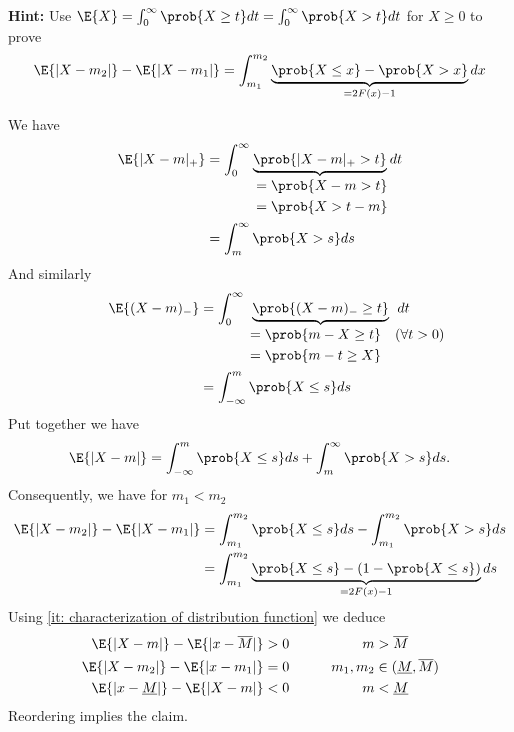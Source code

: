 \begin{exercise}
\begin{enumerate}[label=(\alph*), noitemsep]
 		\textbf{Hint:}
            Use \(\E{X}=\int_0^\infty \prob{X\ge t}dt = \int_0^\infty \prob{X>t}dt\)
            for \(X\ge 0\) to prove
            \[
                \E{\abs{X-m_2}} - \E{\abs{X-m_1}}
                = \int_{m_1}^{m_2} \underbrace{\prob{X\le x} - \prob{X>x}}_{=2F(x)-1}dx
            \]
		\begin{solution}
			We have
			\begin{align*}
				\E{\abs{X-m}_+}
				&= \int_0^\infty \underbrace{\prob{\abs{X-m}_+ > t}}_{
					\begin{aligned}
						&=\prob{X-m>t}\\
						&=\prob{X> t-m}
					\end{aligned}
				} dt\\
				&= \int_m^\infty \prob{X>s}ds
			\end{align*}
			And similarly
			\begin{align*}
				\E{(X-m)_-}
				&= \int_0^\infty \underbrace{\prob{(X-m)_- \ge t}}_{
					\begin{aligned}
						&=\prob{m-X\ge t} \quad \mathrlap{(\forall t>0)}\\
						&=\prob{m-t\ge X}
					\end{aligned}
				} dt\\
				&= \int_{-\infty}^m \prob{X\le s}ds
			\end{align*}
			Put together we have
            \[
				\E{\abs{X-m}}
				= \int_{-\infty}^m \prob{X\le s}ds + \int_m^\infty \prob{X>s}ds.
            \]
            Consequently, we have for \(m_1 < m_2\)
            \[\begin{aligned}
                \E{\abs{X-m_2}} - \E{\abs{X-m_1}}
                &= \int_{m_1}^{m_2} \prob{X\le s}ds - \int_{m_1}^{m_2} \prob{X>s}ds
                \\
                &= \int_{m_1}^{m_2} \underbrace{\prob{X\le s} - (1-\prob{X\le s})}_{=2F(x) -1}ds
            \end{aligned}
            \]
            Using \ref{it: characterization of distribution function} we deduce
            \begin{alignat*}{3}
                \E{\abs{X-m}} - \E{\abs{x-\overline{M}}} &> 0
                & m &> \overline{M} 
                \\
                \E{\abs{X-m_2}} - \E{\abs{x-m_1}} &= 0
                \qquad & m_1, m_2 &\in (\underline{M}, \overline{M})
                \\
                \E{\abs{x-\underline{M}}} - \E{\abs{X-m}} &< 0
                & m &< \underline{M}
            \end{alignat*}
            Reordering implies the claim. \qedhere
		\end{solution}
	\end{enumerate}
\end{exercise}

